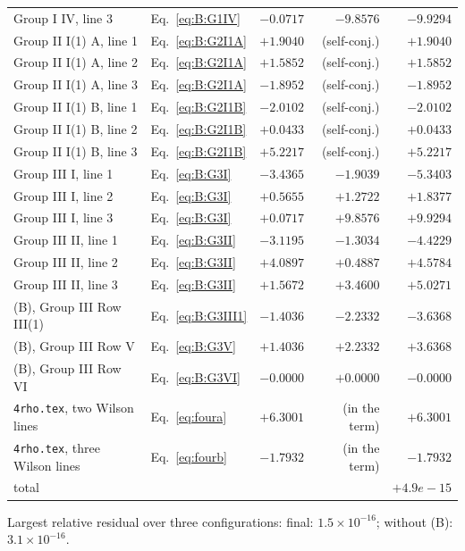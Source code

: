 \documentclass[10pt]{article}
\numberwithin{equation}{section}
\begin{document}
\begin{longtable}{@{}llrrr@{}}
Group I IV, line 3 & Eq.~\eqref{eq:B:G1IV} & $-0.0717$ & $-9.8576$ & $-9.9294$\\
Group II I(1) A, line 1 & Eq.~\eqref{eq:B:G2I1A} & $+1.9040$ & (self-conj.) & $+1.9040$\\
Group II I(1) A, line 2 & Eq.~\eqref{eq:B:G2I1A} & $+1.5852$ & (self-conj.) & $+1.5852$\\
Group II I(1) A, line 3 & Eq.~\eqref{eq:B:G2I1A} & $-1.8952$ & (self-conj.) & $-1.8952$\\
Group II I(1) B, line 1 & Eq.~\eqref{eq:B:G2I1B} & $-2.0102$ & (self-conj.) & $-2.0102$\\
Group II I(1) B, line 2 & Eq.~\eqref{eq:B:G2I1B} & $+0.0433$ & (self-conj.) & $+0.0433$\\
Group II I(1) B, line 3 & Eq.~\eqref{eq:B:G2I1B} & $+5.2217$ & (self-conj.) & $+5.2217$\\
Group III I, line 1 & Eq.~\eqref{eq:B:G3I} & $-3.4365$ & $-1.9039$ & $-5.3403$\\
Group III I, line 2 & Eq.~\eqref{eq:B:G3I} & $+0.5655$ & $+1.2722$ & $+1.8377$\\
Group III I, line 3 & Eq.~\eqref{eq:B:G3I} & $+0.0717$ & $+9.8576$ & $+9.9294$\\
Group III II, line 1 & Eq.~\eqref{eq:B:G3II} & $-3.1195$ & $-1.3034$ & $-4.4229$\\
Group III II, line 2 & Eq.~\eqref{eq:B:G3II} & $+4.0897$ & $+0.4887$ & $+4.5784$\\
Group III II, line 3 & Eq.~\eqref{eq:B:G3II} & $+1.5672$ & $+3.4600$ & $+5.0271$\\
(B), Group III Row III(1) & Eq.~\eqref{eq:B:G3III1} & $-1.4036$ & $-2.2332$ & $-3.6368$\\
(B), Group III Row V & Eq.~\eqref{eq:B:G3V} & $+1.4036$ & $+2.2332$ & $+3.6368$\\
(B), Group III Row VI & Eq.~\eqref{eq:B:G3VI} & $-0.0000$ & $+0.0000$ & $-0.0000$\\
\texttt{4rho.tex}, two Wilson lines & Eq.~\eqref{eq:foura} & $+6.3001$ & (in the term) & $+6.3001$\\
\texttt{4rho.tex}, three Wilson lines & Eq.~\eqref{eq:fourb} & $-1.7932$ & (in the term) & $-1.7932$\\
\midrule
total & & & & $+4.9e-15$\\\bottomrule
\end{longtable}
\noindent Largest relative residual over three configurations: final: $1.5\times10^{-16}$; without (B): $3.1\times10^{-16}$.
\end{document}
